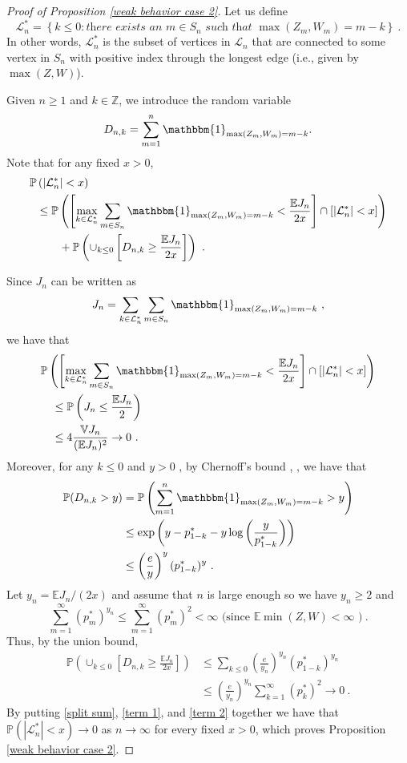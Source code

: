 \documentclass[12pt]{article}
\newcommand{\Z}{\mathbb{Z}}
\newcommand{\E}{\mathbb{E}}
\numberwithin{equation}{section} \font\titre=cmbx12
\def\IND{\mathbbm{1}}
\newcommand{\V}{\mathbb{V}}
\newcommand{\PP}{\mathbb{P}}
\newcommand{\Lset}{\mathcal{L}} %
\begin{document}
\begin{proof}[Proof of Proposition \ref{weak behavior case 2}]
 Let us define $$\Lset_n^* =\left\{ k\le 0 : \textit{there exists an }  m\in S_n \textit{ such that } \max (Z_m,W_m)= m-k\right\}~.$$ In other words, $\Lset_n^*$ is the subset of vertices in $\Lset_n$ that are connected to some vertex in $S_n$ with positive index through the longest edge (i.e., given by $\max (Z,W)$).

Given $n\ge 1$ and $k\in \Z$, we introduce the 
random variable $$D_{n,k}=\sum_{m=1}^n \IND_{\max(Z_m,W_m)=m-k}.$$
Note that for any fixed $x>0$,  
\begin{align}
\PP&\left(\left|\Lset_n^*\right|<x\right) \\
&\le \PP\left( \left[\max_{k\in \Lset_n^*} \sum_{m\in S_n}\IND_{\max(Z_m,W_m)=m-k}< \frac{\E J_n}{2x} \right] \cap \left[\left|\Lset_n^*\right|<x  \right]\right) \nonumber\\
&\qquad +\PP \left(\cup_{k\le 0} \left[ D_{n,k} \ge \frac{\E J_n}{2x} \right] \right)~. \label{split sum}
\end{align}

Since $J_n$ can be written as $$J_n=\sum_{k\in\Lset_n^*}\sum_{m\in S_n}\IND_{\max(Z_m,W_m)=m-k}~, $$
we have that 
\begin{align}
&\PP\left( \left[\max_{k\in \Lset_n^*} \sum_{m\in S_n}\IND_{\max(Z_m,W_m)=m-k}< \frac{\E J_n}{2x} \right] \cap \left[\left|\Lset_n^*\right|<x  \right]\right) \nonumber\\
&\quad\le \PP\left(J_n\le \frac{\E J_n}{2}\right) \nonumber \\
&\quad\le 4\frac{\V J_n}{(\E J_n)^2}\to 0 ~. \label{term 1}
\end{align}
Moreover, for any $k\le 0$ and $y>0$ , by Chernoff's bound \cite{chernoff}, \cite{boucheron}, we have that
\begin{align*}
\PP(D_{n,k} > y) &= \PP\left(\sum_{m=1}^n \IND_{\max(Z_m,W_m)=m-k}> y\right) \\
&\le \exp\left( y-p_{1-k}^* - y\log\left(\frac{y}{p_{1-k}^*} \right) \right) \\
&\le \left( \frac{e}{y}\right)^y (p_{1-k}^*)^y ~.
\end{align*}
Let $y_n=\E J_n/(2x)$ and assume that $n$ is large enough so we have $y_n \ge 2$ and $$\sum_{m=1}^\infty (p_{m}^*)^{y_n} \le \sum_{m=1}^\infty (p_{m}^*)^2<\infty \text{ (since } \E\min(Z,W)<\infty \text{ )}~.$$
Thus, by the union bound, 
\begin{align}
    \PP \left(\cup_{k\le 0} \left[ D_{n,k} \ge \frac{\E J_n}{2x} \right]\right) 
    &\le \sum_{k\le 0} \left( \frac{e}{y_n}\right)^{y_n} (p_{1-k}^*)^{y_n} \nonumber \\
    &\le \left( \frac{e}{y_n}\right)^{y_n}  \sum_{k=1}^\infty (p_{k}^*)^2 \to 0 ~. \label{term 2}
\end{align}
By putting \eqref{split sum}, \eqref{term 1}, and \eqref{term 2} together we have that $\PP\left(\left|\Lset_n^*\right|<x\right)\to 0$ as $n\to \infty$ for every fixed $x>0$, which proves Proposition \ref{weak behavior case 2}. 
\end{proof}
\end{document}
